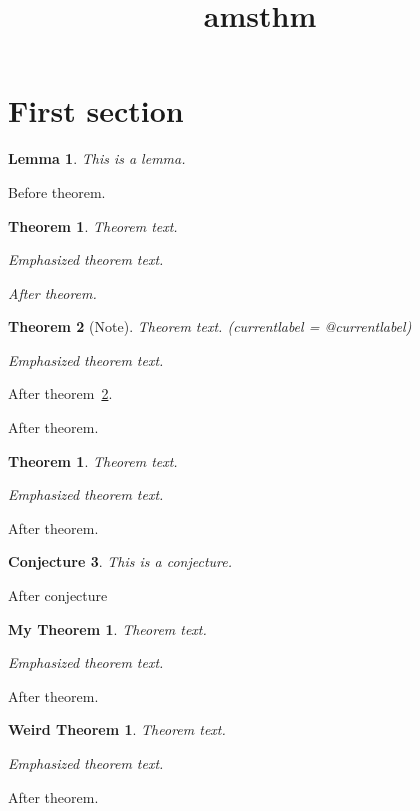 \documentclass{amsart}
\title{amsthm}
\newtheorem{lem}{Lemma}
\newtheorem{theorem}{Theorem}[section]
\newtheorem{conj}[theorem]{Conjecture}
\newtheorem*{theorem*}{Theorem}
\theoremstyle{mystyle}
\newtheorem{mytheorem}{My Theorem}
\theoremstyle{weird}
\newtheorem{weirdtheorem}{Weird Theorem}
\begin{document}
\maketitle

\section{First section}

\begin{lem}This is a lemma.\end{lem}

Before theorem.

\begin{theorem}
Theorem text.

Emphasized \emph{theorem} text.
\end{theorem}

{\it After theorem.}

\begin{theorem}[Note]\label{labeled}\it
Theorem text. (currentlabel = \csname @currentlabel\endcsname)

Emphasized \emph{theorem} text.
\end{theorem}

After theorem~\ref{labeled}.

After theorem.

\begin{theorem*}
Theorem text.

Emphasized \emph{theorem} text.
\end{theorem*}

After theorem.

\begin{conj}This is a conjecture.\end{conj}

After conjecture

\begin{mytheorem}
Theorem text.

Emphasized \emph{theorem} text.
\end{mytheorem}

After theorem.

\begin{weirdtheorem}
Theorem text.

Emphasized \emph{theorem} text.
\end{weirdtheorem}

After theorem.
\end{document}
